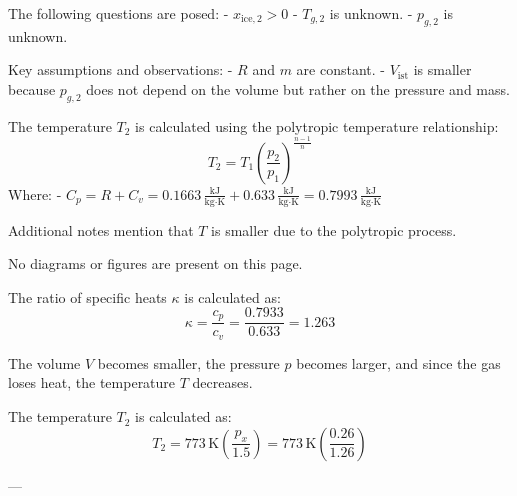 The following questions are posed:  
- \( x_{\text{ice},2} > 0 \)  
- \( T_{g,2} \) is unknown.  
- \( p_{g,2} \) is unknown.  

Key assumptions and observations:  
- \( R \) and \( m \) are constant.  
- \( V_{\text{ist}} \) is smaller because \( p_{g,2} \) does not depend on the volume but rather on the pressure and mass.  

The temperature \( T_2 \) is calculated using the polytropic temperature relationship:  
\[
T_2 = T_1 \left( \frac{p_2}{p_1} \right)^{\frac{n-1}{n}}
\]  
Where:  
- \( C_p = R + C_v = 0.1663 \, \frac{\text{kJ}}{\text{kg} \cdot \text{K}} + 0.633 \, \frac{\text{kJ}}{\text{kg} \cdot \text{K}} = 0.7993 \, \frac{\text{kJ}}{\text{kg} \cdot \text{K}} \)  

Additional notes mention that \( T \) is smaller due to the polytropic process.  

No diagrams or figures are present on this page.

The ratio of specific heats \( \kappa \) is calculated as:  
\[
\kappa = \frac{c_p}{c_v} = \frac{0.7933}{0.633} = 1.263
\]  

The volume \( V \) becomes smaller, the pressure \( p \) becomes larger, and since the gas loses heat, the temperature \( T \) decreases.  

The temperature \( T_2 \) is calculated as:  
\[
T_2 = 773 \, \text{K} \left( \frac{p_x}{1.5} \right) = 773 \, \text{K} \left( \frac{0.26}{1.26} \right)
\]  

---